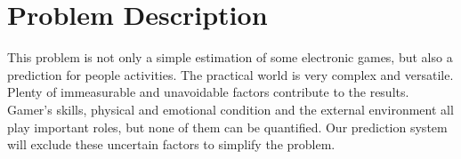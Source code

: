 \section{Problem Description}
This problem is not only a simple estimation of some electronic games,
but also a prediction for people activities.
The practical world is very complex and versatile.
Plenty of immeasurable and unavoidable factors contribute to the results.
Gamer’s skills, physical and emotional condition and the external environment all play important roles,
but none of them can be quantified.
Our prediction system will exclude these uncertain factors to simplify the problem.
